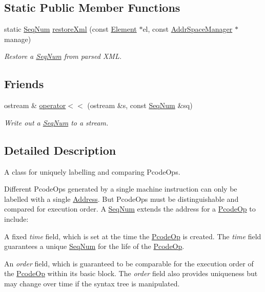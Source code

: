 \subsection*{Static Public Member Functions}
\begin{DoxyCompactItemize}
\item 
static \mbox{\hyperlink{class_seq_num}{Seq\+Num}} \mbox{\hyperlink{class_seq_num_abf4894a48a7ba90309bab7c56ccb2a65}{restore\+Xml}} (const \mbox{\hyperlink{class_element}{Element}} $\ast$el, const \mbox{\hyperlink{class_addr_space_manager}{Addr\+Space\+Manager}} $\ast$manage)
\begin{DoxyCompactList}\small\item\em Restore a \mbox{\hyperlink{class_seq_num}{Seq\+Num}} from parsed X\+ML. \end{DoxyCompactList}\end{DoxyCompactItemize}
\subsection*{Friends}
\begin{DoxyCompactItemize}
\item 
ostream \& \mbox{\hyperlink{class_seq_num_a5c297423265bab5c45a78f81ba897152}{operator$<$$<$}} (ostream \&s, const \mbox{\hyperlink{class_seq_num}{Seq\+Num}} \&sq)
\begin{DoxyCompactList}\small\item\em Write out a \mbox{\hyperlink{class_seq_num}{Seq\+Num}} to a stream. \end{DoxyCompactList}\end{DoxyCompactItemize}


\subsection{Detailed Description}
A class for uniquely labelling and comparing Pcode\+Ops. 

Different Pcode\+Ops generated by a single machine instruction can only be labelled with a single \mbox{\hyperlink{class_address}{Address}}. But Pcode\+Ops must be distinguishable and compared for execution order. A \mbox{\hyperlink{class_seq_num}{Seq\+Num}} extends the address for a \mbox{\hyperlink{class_pcode_op}{Pcode\+Op}} to include\+:
\begin{DoxyItemize}
\item A fixed {\itshape time} field, which is set at the time the \mbox{\hyperlink{class_pcode_op}{Pcode\+Op}} is created. The {\itshape time} field guarantees a unique \mbox{\hyperlink{class_seq_num}{Seq\+Num}} for the life of the \mbox{\hyperlink{class_pcode_op}{Pcode\+Op}}.
\item An {\itshape order} field, which is guaranteed to be comparable for the execution order of the \mbox{\hyperlink{class_pcode_op}{Pcode\+Op}} within its basic block. The {\itshape order} field also provides uniqueness but may change over time if the syntax tree is manipulated. 
\end{DoxyItemize}

